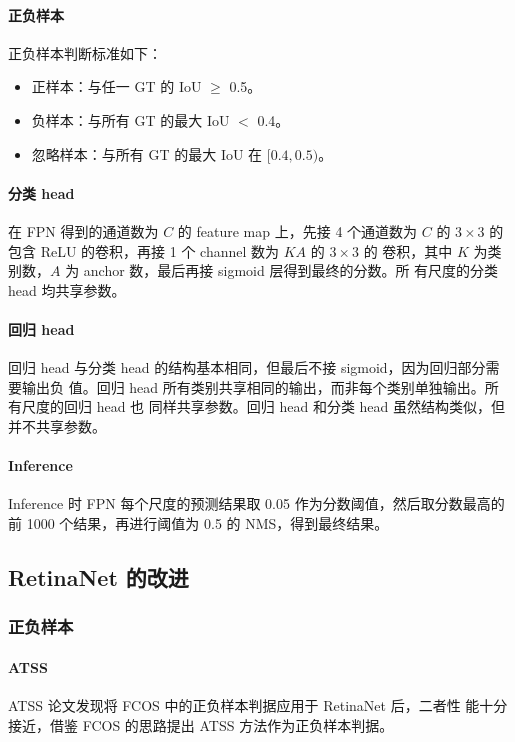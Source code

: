 \paragraph{正负样本}
正负样本判断标准如下：
\begin{itemize}
  \item 正样本：与任一 GT 的 IoU $\geq$ 0.5。
  \item 负样本：与所有 GT 的最大 IoU $ < $ 0.4。
  \item 忽略样本：与所有 GT 的最大 IoU 在 $[0.4, 0.5)$。
\end{itemize}

\paragraph{分类 head}
在 FPN 得到的通道数为 $C$ 的 feature map 上，先接 4 个通道数为 $C$ 的
$3 \times 3$ 的包含 ReLU 的卷积，再接 1 个 channel 数为 $KA$ 的 $3 \times 3$ 的
卷积，其中 $K$ 为类别数，$A$ 为 anchor 数，最后再接 sigmoid 层得到最终的分数。所
有尺度的分类 head 均共享参数。

\paragraph{回归 head}
回归 head 与分类 head 的结构基本相同，但最后不接 sigmoid，因为回归部分需要输出负
值。回归 head 所有类别共享相同的输出，而非每个类别单独输出。所有尺度的回归 head 也
同样共享参数。回归 head 和分类 head 虽然结构类似，但并不共享参数。

\paragraph{Inference}
Inference 时 FPN 每个尺度的预测结果取 0.05 作为分数阈值，然后取分数最高的前 1000
个结果，再进行阈值为 0.5 的 NMS，得到最终结果。

\subsection{RetinaNet 的改进}

\subsubsection{正负样本}
\paragraph{ATSS}
ATSS 论文发现将 FCOS\cite{2019-FCOS} 中的正负样本判据应用于 RetinaNet 后，二者性
能十分接近，借鉴 FCOS 的思路提出 ATSS 方法作为正负样本判据。

